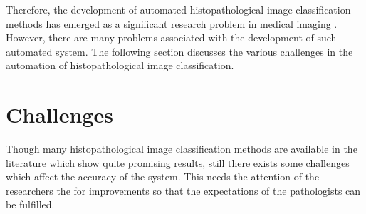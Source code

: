 Therefore, the development of automated histopathological image classification methods has emerged as a significant research problem in medical imaging \cite{gurcan2009}\cite{srinivas2014}\cite{saraswat2013}. However, there are many problems associated with the development of such automated system. The following section discusses the various challenges in the automation of histopathological image classification. 



\section{Challenges}\label{ch1:sec:Challenges}
Though many histopathological image classification methods are available in the literature which show quite promising results, still there exists some challenges which affect the accuracy of the system. This needs the attention of the researchers the for improvements so that the expectations of the pathologists can be fulfilled.


